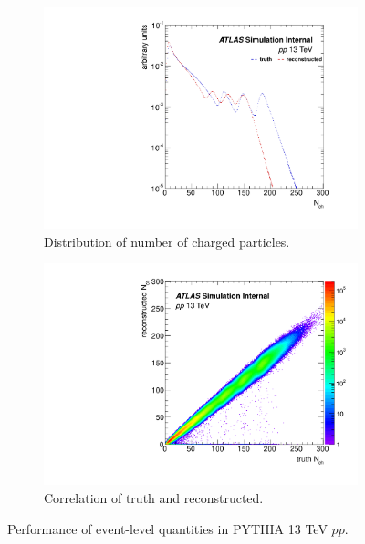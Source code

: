 \begin{figure}[H]
\begin{subfigure}{0.5\textwidth}
\includegraphics[width=1.\linewidth]{figs/sec_evtSlc/trkEff_pp13_mon_dis_nCh.pdf}
\caption{Distribution of number of charged particles.}
\end{subfigure}
\begin{subfigure}{0.5\textwidth}
\centering
\includegraphics[width=1.\linewidth]{figs/sec_evtSlc/trkEff_pp13_mon_crr_nCh.pdf}
\caption{Correlation of truth and reconstructed.}
\end{subfigure}

\caption{Performance of event-level quantities in PYTHIA 13 TeV $pp$.}
\label{fig:trkEff_pp13_mon_evt}
\end{figure}


